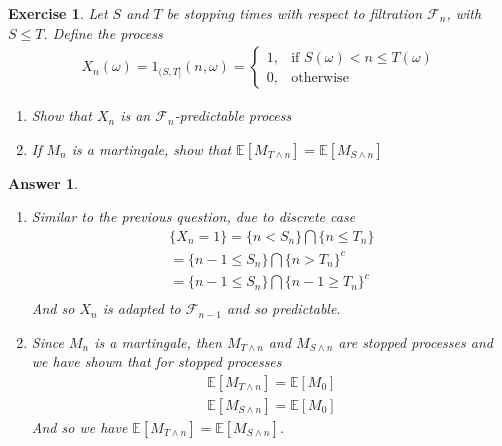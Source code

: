 \documentclass[12pt]{article}
\theoremstyle{colon}
\newtheorem{exercise}{Exercise}
\newtheorem*{answer}{Answer}
\begin{document}
\clearpage

\begin{exercise}
  Let $S$ and $T$ be stopping times with respect to filtration $\mathcal{F}_n$, with $S \leq T$. Define the process
  \begin{gather*}
    X_n(\omega) = 1_{(S,T]}(n, \omega) = \begin{cases}
      1, & \text{if } S(\omega) < n \leq T(\omega) \\
      0, & \text{otherwise}
    \end{cases}
  \end{gather*}
  \begin{enumerate}[label=\alph*)]
    \item Show that $X_n$ is an $\mathcal{F}_n$-predictable process
    \item If $M_n$ is a martingale, show that $\mathbb{E}[M_{T \land n}] = \mathbb{E}[M_{S \land n}]$
  \end{enumerate}
\end{exercise}

\begin{answer}
  \leavevmode
  \begin{enumerate}[label=\alph*)]
    \item Similar to the previous question, due to discrete case
      \begin{gather*}
        \{ X_n = 1 \} = \{ n < S_n \} \bigcap \{ n \leq T_n \} \\
        = \{ n-1 \leq S_n \} \bigcap \{ n > T_n \}^c \\
        = \{ n-1 \leq S_n \} \bigcap \{ n-1 \geq T_n \}^c \\
      \end{gather*}
      And so $X_n$ is adapted to $\mathcal{F}_{n-1}$ and so predictable.
    \item Since $M_n$ is a martingale, then $M_{T \land n}$ and $M_{S \land n}$ are stopped processes and we have shown that for stopped processes
      \begin{gather*}
        \mathbb{E}[M_{T \land n}] = \mathbb{E}[M_0] \\
        \mathbb{E}[M_{S \land n}] = \mathbb{E}[M_0]
      \end{gather*}
      And so we have $\mathbb{E}[M_{T \land n}] = \mathbb{E}[M_{S \land n}]$.
  \end{enumerate}
\end{answer}

\clearpage
\end{document}
